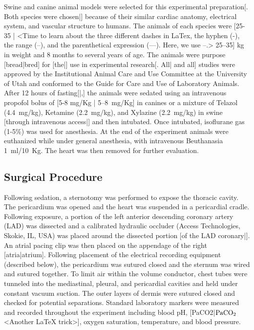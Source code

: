 \documentclass[twocolumn]{cinc}
\begin{document}
Swine and canine animal models were selected for this experimental
preparation[. Both species were chosen|] because of their similar cardiac
anatomy, electrical system, and vascular structure to humans. The animals
of each species were [25-35 | <Time to learn about the three different
dashes in LaTex, the hyphen (-), the range (--), and the parenthetical
expression (---).  Here, we use --.> 25--35] kg in weight and 8 months to
several years of age. The animals were purpose [bread|bred] for [the|] use
in experimental research[. All| and all] studies were approved by the
Institutional Animal Care and Use Committee at the University of Utah and
conformed to the Guide for Care and Use of Laboratory Animals. After 12
hours of fasting[|,] the animals were sedated using an intravenous propofol
bolus of [5-8 mg/Kg | 5--8~mg/Kg] in canines or a mixture of Telazol
(4.4~mg/kg), Ketamine (2.2~mg/kg), and Xylazine (2.2~mg/kg) in swine
[through intravenous access|] and then intubated. Once intubated,
isoflurane gas (1-5\%) was used for anesthesia. At the end of the
experiment animals were euthanized while under general anesthesia, with
intravenous Beuthanasia 1~ml/10~Kg. The heart was then removed for further
evaluation.

\subsection{Surgical Procedure}

Following sedation, a sternotomy was performed to expose the thoracic
cavity. The pericardium was opened and the heart was suspended in a
pericardial cradle. Following exposure, a portion of the left anterior
descending coronary artery (LAD) was dissected and a calibrated hydraulic
occluder (Access Technologies, Skokie, IL, USA) was placed around the
dissected portion [of the LAD coronary|]. An atrial pacing clip was then
placed on the appendage of the right [atria|atrium]. Following placement of
the electrical recording equipment (described below), the pericardium was
sutured closed and the sternum was wired and sutured together. To limit air
within the volume conductor, chest tubes were tunneled into the
mediastinal, pleural, and pericardial cavities and held under constant
vacuum suction. The outer layers of dermis were sutured closed and checked
for potential separations. Standard laboratory markers were measured and
recorded throughout the experiment including blood pH,
[PaCO2|${\rm PaCO_2}$ <Another LaTeX trick>], oxygen saturation,
temperature, and blood pressure.
\end{document}
